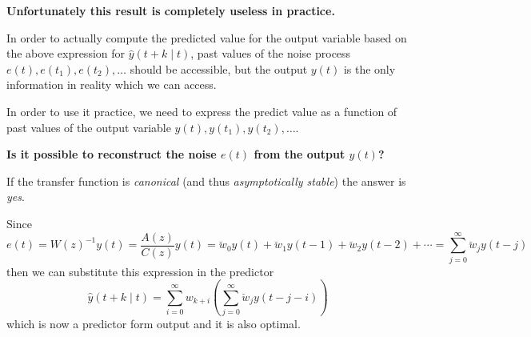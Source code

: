 \textbf{Unfortunately this result is completely useless in practice.}

In order to actually compute the predicted value for the output variable based on the above expression for $\hat{y}(t+k \mid t)$, past values of the noise process $e(t),e(t_1),e(t_2),\ldots$ should be accessible, but the output $y(t)$ is the only information in reality which we can access.

In order to use it practice, we need to express the predict value as a function of past values of the output variable $y(t), y(t_1), y(t_2),\ldots$.

\textbf{Is it possible to reconstruct the noise $e(t)$ from the output $y(t)$?}

If the transfer function is \emph{canonical} (and thus \emph{asymptotically stable}) the answer is \emph{yes}.

Since
\begin{equation}\label{eq:reconstruction-noise-from-data}
	e(t)=W(z)^{-1} y(t)=\frac{A(z)}{C(z)} y(t)=\breve{w}_{0} y(t)+\breve{w}_{1} y(t-1)+\breve{w}_{2} y(t-2)+\cdots = \sum_{j=0}^{\infty} \breve{w}_{j}y(t-j)
\end{equation}
then we can substitute this expression in the predictor
\[
	\boxed{\hat{y}(t+k \mid t)=\sum_{i=0}^{\infty} w_{k+i}\left(\sum_{j=0}^{\infty} \breve{w}_{j}y(t-j-i)\right)}
\]
which is now a predictor form output and it is also optimal.

